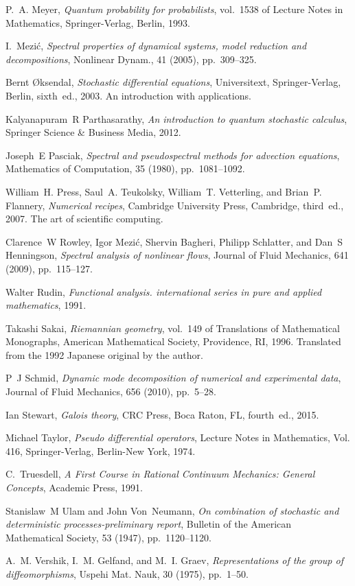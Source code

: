 \documentclass[final,leqno]{amsart}
\begin{document}
\begin{thebibliography}{10}
{\sc P.~A. Meyer}, {\em Quantum probability for probabilists}, vol.~1538 of
  Lecture Notes in Mathematics, Springer-Verlag, Berlin, 1993.

{\sc I.~Mezi{\'c}}, {\em Spectral properties of dynamical systems, model
  reduction and decompositions}, Nonlinear Dynam., 41 (2005), pp.~309--325.

{\sc Bernt {\O}ksendal}, {\em Stochastic differential equations}, Universitext,
  Springer-Verlag, Berlin, sixth~ed., 2003.
\newblock An introduction with applications.

{\sc Kalyanapuram~R Parthasarathy}, {\em An introduction to quantum stochastic
  calculus}, Springer Science \& Business Media, 2012.

{\sc Joseph~E Pasciak}, {\em Spectral and pseudospectral methods for advection
  equations}, Mathematics of Computation, 35 (1980), pp.~1081--1092.

{\sc William~H. Press, Saul~A. Teukolsky, William~T. Vetterling, and Brian~P.
  Flannery}, {\em Numerical recipes}, Cambridge University Press, Cambridge,
  third~ed., 2007.
\newblock The art of scientific computing.

{\sc Clarence~W Rowley, Igor Mezi{\'c}, Shervin Bagheri, Philipp Schlatter, and
  Dan~S Henningson}, {\em Spectral analysis of nonlinear flows}, Journal of
  Fluid Mechanics, 641 (2009), pp.~115--127.

{\sc Walter Rudin}, {\em Functional analysis. international series in pure and
  applied mathematics}, 1991.

{\sc Takashi Sakai}, {\em Riemannian geometry}, vol.~149 of Translations of
  Mathematical Monographs, American Mathematical Society, Providence, RI, 1996.
\newblock Translated from the 1992 Japanese original by the author.

{\sc P~J Schmid}, {\em Dynamic mode decomposition of numerical and experimental
  data}, Journal of Fluid Mechanics, 656 (2010), pp.~5--28.

{\sc Ian Stewart}, {\em Galois theory}, CRC Press, Boca Raton, FL, fourth~ed.,
  2015.

{\sc Michael Taylor}, {\em Pseudo differential operators}, Lecture Notes in
  Mathematics, Vol. 416, Springer-Verlag, Berlin-New York, 1974.

{\sc C.~Truesdell}, {\em A First Course in Rational Continuum Mechanics:
  General Concepts}, Academic Press, 1991.

{\sc Stanislaw~M Ulam and John Von~Neumann}, {\em On combination of stochastic
  and deterministic processes-preliminary report}, Bulletin of the American
  Mathematical Society, 53 (1947), pp.~1120--1120.

{\sc A.~M. Vershik, I.~M. Gelfand, and M.~I. Graev}, {\em Representations of
  the group of diffeomorphisms}, Uspehi Mat. Nauk, 30 (1975), pp.~1--50.

\end{thebibliography}
\end{document}
